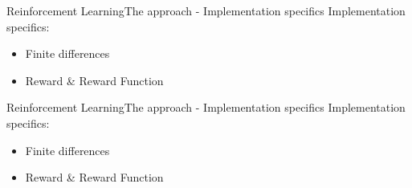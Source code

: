 \documentclass[aspectratio=169,10pt,t]{beamer}
\newtheorem{algorithm}{Algorithm}
\begin{document}
\begin{frame}{Reinforcement Learning}{The approach - Implementation specifics\vphantom{(y}}
\vspace{-0.7em}
Implementation specifics:
\begin{itemize}
  \item {\color{blue}Finite differences}
  \item Reward \& Reward Function
\end{itemize}

\end{frame}

\begin{frame}{Reinforcement Learning}{The approach - Implementation specifics\vphantom{(y}}
\vspace{-0.7em}
Implementation specifics:
\begin{itemize}
  \item Finite differences
  \item {\color{blue}Reward \& Reward Function}
\end{itemize}
\end{frame}
\end{document}
